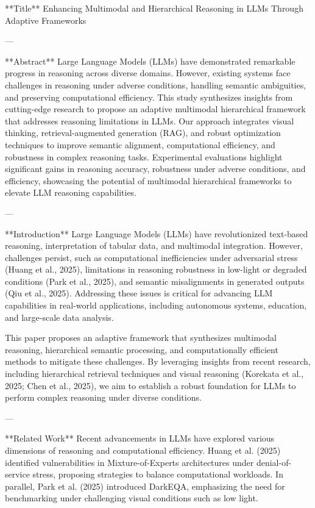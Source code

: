 **Title**  
Enhancing Multimodal and Hierarchical Reasoning in LLMs Through Adaptive Frameworks  

---

**Abstract**  
Large Language Models (LLMs) have demonstrated remarkable progress in reasoning across diverse domains. However, existing systems face challenges in reasoning under adverse conditions, handling semantic ambiguities, and preserving computational efficiency. This study synthesizes insights from cutting-edge research to propose an adaptive multimodal hierarchical framework that addresses reasoning limitations in LLMs. Our approach integrates visual thinking, retrieval-augmented generation (RAG), and robust optimization techniques to improve semantic alignment, computational efficiency, and robustness in complex reasoning tasks. Experimental evaluations highlight significant gains in reasoning accuracy, robustness under adverse conditions, and efficiency, showcasing the potential of multimodal hierarchical frameworks to elevate LLM reasoning capabilities.  

---

**Introduction**  
Large Language Models (LLMs) have revolutionized text-based reasoning, interpretation of tabular data, and multimodal integration. However, challenges persist, such as computational inefficiencies under adversarial stress (Huang et al., 2025), limitations in reasoning robustness in low-light or degraded conditions (Park et al., 2025), and semantic misalignments in generated outputs (Qiu et al., 2025). Addressing these issues is critical for advancing LLM capabilities in real-world applications, including autonomous systems, education, and large-scale data analysis.  

This paper proposes an adaptive framework that synthesizes multimodal reasoning, hierarchical semantic processing, and computationally efficient methods to mitigate these challenges. By leveraging insights from recent research, including hierarchical retrieval techniques and visual reasoning (Korekata et al., 2025; Chen et al., 2025), we aim to establish a robust foundation for LLMs to perform complex reasoning under diverse conditions.  

---

**Related Work**  
Recent advancements in LLMs have explored various dimensions of reasoning and computational efficiency. Huang et al. (2025) identified vulnerabilities in Mixture-of-Experts architectures under denial-of-service stress, proposing strategies to balance computational workloads. In parallel, Park et al. (2025) introduced DarkEQA, emphasizing the need for benchmarking under challenging visual conditions such as low light.  

